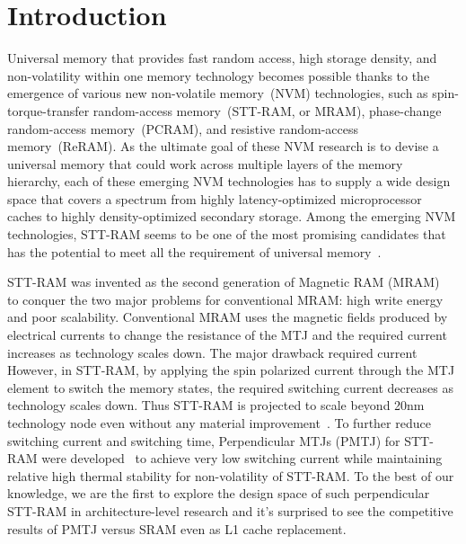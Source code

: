 \section{Introduction} \label{sec:intro}

Universal memory that provides fast random access, high storage density, and non-volatility within one memory technology becomes possible thanks to the emergence of various new non-volatile memory~(NVM) technologies, such as spin-torque-transfer random-access memory~(STT-RAM, or MRAM), phase-change random-access memory~(PCRAM), and resistive random-access memory~(ReRAM). As the ultimate
goal of these NVM research is to devise a universal memory that could work across multiple layers of the memory hierarchy, each of these emerging NVM technologies has to supply a wide design space that covers a spectrum from highly latency-optimized microprocessor caches to highly density-optimized secondary storage. Among the emerging NVM technologies, STT-RAM seems to be one of the most promising candidates that has the potential to meet all the requirement of universal memory~\cite{STTRAM:Review10B,STTRAM:Review10A}.

STT-RAM was invented as the second generation of Magnetic RAM (MRAM)~\cite{STTRAM:IEDM05} to conquer the two major problems for conventional MRAM: high write energy and poor scalability. Conventional MRAM uses the magnetic fields produced by electrical currents
to change the resistance of the MTJ and the required current increases as technology scales down. The major drawback required current However, in STT-RAM, by applying the spin polarized current through the MTJ element to switch the memory states, the required switching current decreases as technology scales down. Thus STT-RAM is projected to scale beyond 20nm technology node even without any material improvement~\cite{STTRAM:Grandis11}. To further reduce switching current and switching time, Perpendicular MTJs (PMTJ) for STT-RAM were developed~\cite{PMTJ:APL06,PMTJ:APL11,PMTJ:Grandis10,PMTJ:Toshiba08,PMTJ:Xiaochun06} to achieve very low switching current while maintaining relative high thermal stability for non-volatility of STT-RAM. To the best of our knowledge, we are the first to explore the design space of such perpendicular STT-RAM in architecture-level research and it's surprised to see the competitive results of PMTJ versus SRAM even as L1 cache replacement.

